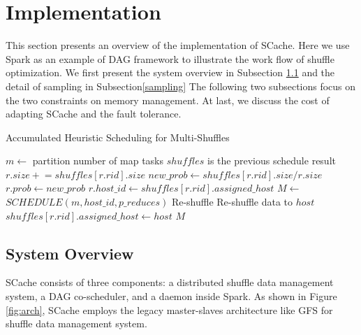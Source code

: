 \section{Implementation}\label{impl}
This section presents an overview of the implementation of SCache. 
Here we use Spark as an example of DAG framework to illustrate the work flow of shuffle optimization. 
We first present the system overview in Subsection \ref{arch} and the detail of sampling in Subsection\ref{sampling}
The following two subsections focus on the two constraints on memory management.
At last, we discuss the cost of adapting SCache and the fault tolerance. 

\begin{minipage}{\columnwidth}
\begin{algorithm}[H]
\caption{Accumulated Heuristic Scheduling for Multi-Shuffles}
\label{mhminheap}
	\begin{algorithmic}[1]
	\small
		\State $m\gets$ partition number of map tasks
		\Comment $shuffles$ is the previous schedule result 
			\State $r.size \mathrel{+}= shuffles\left[r.rid\right].size$
			\State $new\_prob\gets shuffles\left[r.rid\right].size / r.size$
				\State $r.prob\gets new\_prob$
				\State $r.host\_id\gets shuffles\left[r.rid\right].assigned\_host$
			\EndIf
		\EndFor
		\State $M\gets$ $SCHEDULE\left(m, host\_id, p\_reduces\right)$
			\Comment Re-shuffle
				\State Re-shuffle data to $host$
				\State $shuffles\left[r.rid\right].assigned\_host\gets host$
				\EndIf
			\EndFor
		\EndFor
		\Return $M$
	\EndProcedure
	\end{algorithmic}
\end{algorithm}
\end{minipage}

\subsection{System Overview}\label{arch}
SCache consists of three components: a distributed shuffle data management system, a DAG co-scheduler, and a daemon inside Spark. As shown in Figure \ref{fig:arch}, SCache employs the legacy master-slaves architecture like GFS \cite{gfs} for shuffle data management system. 

